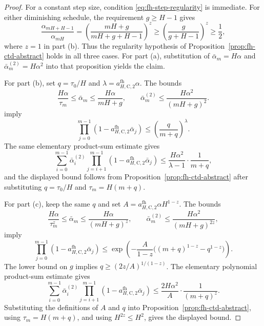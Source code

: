 \documentclass{article}
\begin{document}
\begin{proof}
For a constant step size, condition \eqref{eq:fh-step-regularity} is immediate. For either diminishing schedule, the requirement $g\ge H-1$ gives
\begin{equation}
\frac{\alpha_{mH+H-1}}{\alpha_{mH}}=\left(\frac{mH+g}{mH+g+H-1}\right)^z\ge\left(\frac{g}{g+H-1}\right)^z\ge\frac{1}{2},
\end{equation}
where $z=1$ in part \textup{(b)}. Thus the regularity hypothesis of Proposition~\ref{prop:fh-ctd-abstract} holds in all three cases. For part \textup{(a)}, substitution of $\bar\alpha_m = H\alpha$ and $\bar\alpha_m^{(2)} = H\alpha^2$ into that proposition yields the claim.

For part \textup{(b)}, set $q=\tau_0/H$ and $\lambda=a_{H,\mathrm C,2}^{\mathrm{fh}}\alpha$. The bounds
\begin{equation}
\frac{H\alpha}{\tau_m} \le \bar\alpha_m \le \frac{H\alpha}{mH+g}, \qquad \bar\alpha_m^{(2)} \le \frac{H\alpha^2}{(mH+g)^2}.
\end{equation}
imply
\begin{equation}
\prod_{j=0}^{m-1}(1-a_{H,\mathrm C,2}^{\mathrm{fh}}\bar\alpha_j)\le \left(\frac{q}{m+q}\right)^\lambda.
\end{equation}
The same elementary product-sum estimate gives
\begin{equation}
\sum_{i=0}^{m-1}\bar\alpha_i^{(2)}\prod_{j=i+1}^{m-1}(1-a_{H,\mathrm C,2}^{\mathrm{fh}}\bar\alpha_j)\le \frac{H\alpha^2}{\lambda-1}\cdot\frac{1}{m+q},
\end{equation}
and the displayed bound follows from Proposition~\ref{prop:fh-ctd-abstract} after substituting $q=\tau_0/H$ and $\tau_m=H(m+q)$.

For part \textup{(c)}, keep the same $q$ and set $A=a_{H,\mathrm C,2}^{\mathrm{fh}}\alpha H^{1-z}$. The bounds
\begin{equation}
\frac{H\alpha}{\tau_m^z} \le \bar\alpha_m \le \frac{H\alpha}{(mH+g)^z}, \qquad \bar\alpha_m^{(2)} \le \frac{H\alpha^2}{(mH+g)^{2z}},
\end{equation}
imply
\begin{equation}
\prod_{j=0}^{m-1}(1-a_{H,\mathrm C,2}^{\mathrm{fh}}\bar\alpha_j)\le \exp\left(-\frac{A}{1-z}\bigl((m+q)^{1-z}-q^{1-z}\bigr)\right).
\end{equation}
The lower bound on $g$ implies $q\ge (2z/A)^{1/(1-z)}$. The elementary polynomial product-sum estimate gives
\begin{equation}
\sum_{i=0}^{m-1}\bar\alpha_i^{(2)}\prod_{j=i+1}^{m-1}(1-a_{H,\mathrm C,2}^{\mathrm{fh}}\bar\alpha_j)\le \frac{2H\alpha^2}{A}\cdot\frac{1}{(m+q)^z}.
\end{equation}
Substituting the definitions of $A$ and $q$ into Proposition~\ref{prop:fh-ctd-abstract}, using $\tau_m=H(m+q)$, and using $H^{2z}\le H^2$, gives the displayed bound.
\end{proof}
\end{document}
